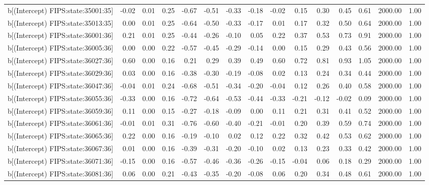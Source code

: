 \begin{table}[ht]
\begin{tabular}{rrrrrrrrrrrrrrr}
  b[(Intercept) FIPS:state:35001:35] & -0.02 & 0.01 & 0.25 & -0.67 & -0.51 & -0.33 & -0.18 & -0.02 & 0.15 & 0.30 & 0.45 & 0.61 & 2000.00 & 1.00 \\ 
  b[(Intercept) FIPS:state:35013:35] & 0.00 & 0.01 & 0.25 & -0.64 & -0.50 & -0.33 & -0.17 & 0.01 & 0.17 & 0.32 & 0.50 & 0.64 & 2000.00 & 1.00 \\ 
  b[(Intercept) FIPS:state:36001:36] & 0.21 & 0.01 & 0.25 & -0.44 & -0.26 & -0.10 & 0.05 & 0.22 & 0.37 & 0.53 & 0.73 & 0.91 & 2000.00 & 1.00 \\ 
  b[(Intercept) FIPS:state:36005:36] & 0.00 & 0.00 & 0.22 & -0.57 & -0.45 & -0.29 & -0.14 & 0.00 & 0.15 & 0.29 & 0.43 & 0.56 & 2000.00 & 1.00 \\ 
  b[(Intercept) FIPS:state:36027:36] & 0.60 & 0.00 & 0.16 & 0.21 & 0.29 & 0.39 & 0.49 & 0.60 & 0.72 & 0.81 & 0.93 & 1.05 & 2000.00 & 1.00 \\ 
  b[(Intercept) FIPS:state:36029:36] & 0.03 & 0.00 & 0.16 & -0.38 & -0.30 & -0.19 & -0.08 & 0.02 & 0.13 & 0.24 & 0.34 & 0.44 & 2000.00 & 1.00 \\ 
  b[(Intercept) FIPS:state:36047:36] & -0.04 & 0.01 & 0.24 & -0.68 & -0.51 & -0.34 & -0.20 & -0.04 & 0.12 & 0.26 & 0.40 & 0.58 & 2000.00 & 1.00 \\ 
  b[(Intercept) FIPS:state:36055:36] & -0.33 & 0.00 & 0.16 & -0.72 & -0.64 & -0.53 & -0.44 & -0.33 & -0.21 & -0.12 & -0.02 & 0.09 & 2000.00 & 1.00 \\ 
  b[(Intercept) FIPS:state:36059:36] & 0.11 & 0.00 & 0.15 & -0.27 & -0.18 & -0.09 & 0.00 & 0.11 & 0.21 & 0.31 & 0.41 & 0.52 & 2000.00 & 1.00 \\ 
  b[(Intercept) FIPS:state:36061:36] & -0.01 & 0.01 & 0.31 & -0.76 & -0.60 & -0.40 & -0.21 & -0.01 & 0.20 & 0.39 & 0.59 & 0.74 & 2000.00 & 1.00 \\ 
  b[(Intercept) FIPS:state:36065:36] & 0.22 & 0.00 & 0.16 & -0.19 & -0.10 & 0.02 & 0.12 & 0.22 & 0.32 & 0.42 & 0.53 & 0.62 & 2000.00 & 1.00 \\ 
  b[(Intercept) FIPS:state:36067:36] & 0.01 & 0.00 & 0.16 & -0.39 & -0.31 & -0.20 & -0.10 & 0.02 & 0.13 & 0.23 & 0.33 & 0.42 & 2000.00 & 1.00 \\ 
  b[(Intercept) FIPS:state:36071:36] & -0.15 & 0.00 & 0.16 & -0.57 & -0.46 & -0.36 & -0.26 & -0.15 & -0.04 & 0.06 & 0.18 & 0.29 & 2000.00 & 1.00 \\ 
  b[(Intercept) FIPS:state:36081:36] & 0.06 & 0.00 & 0.21 & -0.43 & -0.35 & -0.20 & -0.08 & 0.06 & 0.20 & 0.34 & 0.48 & 0.61 & 2000.00 & 1.00 \\ 

\end{tabular}
\end{table}
